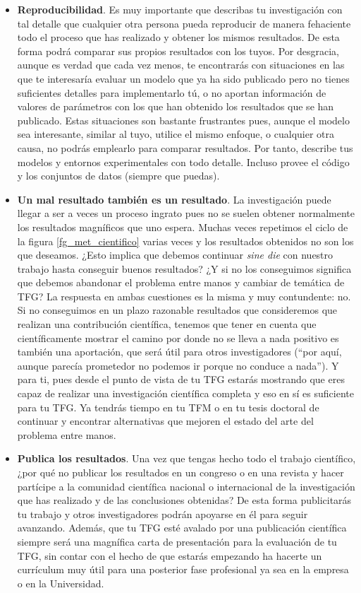 \begin{itemize}
    \item \textbf{Reproducibilidad}. Es muy importante que describas tu investigación con tal detalle que cualquier otra persona pueda reproducir de manera fehaciente todo el proceso que has realizado y obtener los mismos resultados. De esta forma podrá comparar sus propios resultados con los tuyos. Por desgracia, aunque es verdad que cada vez menos, te encontrarás con situaciones en las que te interesaría evaluar un modelo que ya ha sido publicado pero no tienes suficientes detalles para implementarlo tú, o no aportan información de valores de parámetros con los que han obtenido los resultados que se han publicado. Estas situaciones son bastante frustrantes pues, aunque el modelo sea interesante, similar al tuyo, utilice el mismo enfoque, o cualquier otra causa, no podrás emplearlo para comparar resultados. Por tanto, describe tus modelos y entornos experimentales con todo detalle. Incluso provee el código y los conjuntos de datos (siempre que puedas).

    \item \textbf{Un mal resultado también es un resultado}. La investigación puede llegar a ser a veces un proceso ingrato pues no se suelen obtener normalmente los resultados magníficos que uno espera. Muchas veces repetimos el ciclo de la figura \ref{fg_met_cientifico} varias veces y los resultados obtenidos no son los que deseamos. ¿Esto implica que debemos continuar \textit{sine die} con nuestro trabajo hasta conseguir buenos resultados? ¿Y si no los conseguimos significa que debemos abandonar el problema entre manos y cambiar de temática de TFG? La respuesta en ambas cuestiones es la misma y muy contundente: no. Si no conseguimos en un plazo razonable resultados que consideremos que realizan una contribución científica, tenemos que tener en cuenta que científicamente mostrar el camino por donde no se lleva a nada positivo es también una aportación, que será útil para otros investigadores (``por aquí, aunque parecía prometedor no podemos ir porque no conduce a nada''). Y para ti, pues desde el punto de vista de tu TFG estarás mostrando que eres capaz de realizar una investigación científica completa y eso en sí es suficiente para tu TFG. Ya tendrás tiempo en tu TFM o en tu tesis doctoral de continuar y encontrar alternativas que mejoren el estado del arte del problema entre manos.

    \item \textbf{Publica los resultados}. Una vez que tengas hecho todo el trabajo científico, ¿por qué no publicar los resultados en un congreso o en una revista y hacer partícipe a la comunidad científica nacional o internacional de la investigación que has realizado y de las conclusiones obtenidas? De esta forma publicitarás tu trabajo y otros investigadores podrán apoyarse en él para seguir avanzando. Además, que tu TFG esté avalado por una publicación científica siempre será una magnífica carta de presentación para la evaluación de tu TFG, sin contar con el hecho de que estarás empezando ha hacerte un currículum muy útil para una posterior fase profesional ya sea en la empresa o en la Universidad.
\end{itemize}

